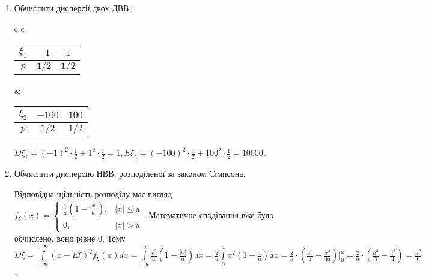 \begin{example}
    \begin{enumerate}
        \item Обчислити дисперсії двох ДВВ:
        
        \begin{tabular}{c c}
            \begin{tabular}{c|c|c}
                $\xi_1$ & $-1$ & $1$ \\ 
                \hline
                $p$ & $1/2$ & $1/2$
            \end{tabular} &
            \begin{tabular}{c|c|c}
                $\xi_2$ & $-100$ & $100$ \\ 
                \hline
                $p$ & $1/2$ & $1/2$
            \end{tabular}
        \end{tabular}
        
        $D\xi_1 = (-1)^2\cdot \frac{1}{2} + 1^2\cdot \frac{1}{2} = 1, E\xi_2 = (-100)^2\cdot \frac{1}{2} + 100^2\cdot \frac{1}{2} = 10000$.
        \item Обчислити дисперсію НВВ, розподіленої за законом Сімпсона.
        
        Відповідна щільність розподілу має вигляд $f_\xi(x) = \begin{cases}
            \frac{1}{a} \left(1 - \frac{|x|}{a}\right), & |x| \leq a \\
            0, & |x| > a
        \end{cases}$.
        Математичне сподівання вже було обчислено, воно рівне 0. Тому $D\xi = \int\limits_{-\infty}^{+\infty} \left(x-E\xi\right)^2 f_\xi(x)dx =
        \int\limits_{-a}^a \frac{x^2}{a}\left(1 - \frac{|x|}{a}\right)dx = \frac{2}{a}\int\limits_0^a {x^2}\left(1 - \frac{x}{a}\right)dx =
        \frac{2}{a}\cdot \left( \frac{x^3}{3} - \frac{x^4}{4a}\right)\Bigr\vert_0^a = \frac{2}{a} \cdot \left( \frac{a^3}{3} - \frac{a^3}{4}\right) = \frac{a^2}{6}$.
    \end{enumerate}
\end{example}

